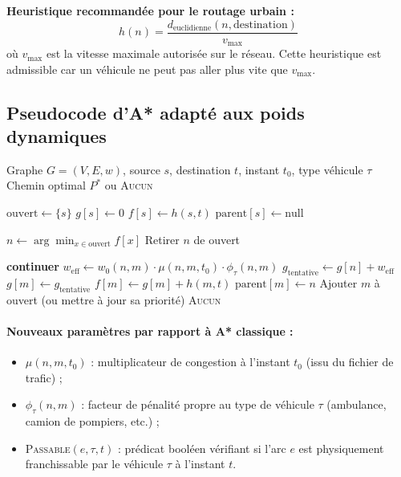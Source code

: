 \documentclass[12pt,a4paper]{article}
\theoremstyle{definition}
\theoremstyle{remark}
\begin{document}
\noindent\textbf{Heuristique recommandée pour le routage urbain :}
$$
h(n) = \frac{d_{\text{euclidienne}}(n, \text{destination})}{v_{\max}}
$$
où $v_{\max}$ est la vitesse maximale autorisée sur le réseau.
Cette heuristique est admissible car un véhicule ne peut pas aller plus
vite que $v_{\max}$.

\subsection{Pseudocode d'A* adapté aux poids dynamiques}

\begin{algorithm}[H]
\caption{A* dynamique avec poids temporels et contraintes véhicule}
\begin{algorithmic}[1]
\Require Graphe $G=(V,E,w)$, source $s$, destination $t$,
         instant $t_0$, type véhicule $\tau$
\Ensure Chemin optimal $P^*$ ou \textsc{Aucun}

\State $\text{ouvert} \gets \{s\}$ 
\State $g[s] \gets 0$
\State $f[s] \gets h(s, t)$
\State $\text{parent}[s] \gets \text{null}$

  \State $n \gets \arg\min_{x \in \text{ouvert}} f[x]$
    \Return {}
  \EndIf
  \State Retirer $n$ de ouvert

      \State \textbf{continuer} 
    \EndIf
    \State $w_{\text{eff}} \gets w_0(n,m) \cdot \mu(n,m, t_0) \cdot \phi_\tau(n,m)$
    \State $g_{\text{tentative}} \gets g[n] + w_{\text{eff}}$
      \State $g[m] \gets g_{\text{tentative}}$
      \State $f[m] \gets g[m] + h(m, t)$
      \State $\text{parent}[m] \gets n$
      \State Ajouter $m$ à ouvert (ou mettre à jour sa priorité)
    \EndIf
  \EndFor
\EndWhile
\Return \textsc{Aucun} 
\end{algorithmic}
\end{algorithm}

\paragraph{Nouveaux paramètres par rapport à A* classique :}
\begin{itemize}
  \item $\mu(n,m,t_0)$ : multiplicateur de congestion à l'instant $t_0$
        (issu du fichier de trafic) ;
  \item $\phi_\tau(n,m)$ : facteur de pénalité propre au type de véhicule $\tau$
        (ambulance, camion de pompiers, etc.) ;
  \item \textsc{Passable}$(e, \tau, t)$ : prédicat booléen vérifiant si
        l'arc $e$ est physiquement franchissable par le véhicule $\tau$
        à l'instant $t$.
\end{itemize}
\end{document}
